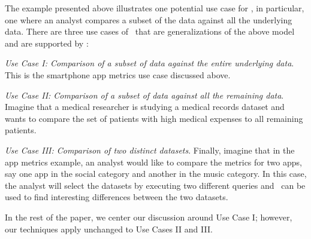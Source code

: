 The example presented above illustrates one potential use case for \SeeDB,
in particular, one where an analyst compares a subset of the data against all
the underlying data.
There are three use cases of \SeeDB\ that are generalizations of the above
model and are supported by \SeeDB:
\begin{denselist}
  \item {\it Use Case I: Comparison of a subset of data against the entire
  underlying data}.
  This is the smartphone app metrics use case discussed above.
  \item {\it Use Case II: Comparison of a subset of data against all the
  remaining data}.
  Imagine that a medical researcher is studying a medical records dataset and
  wants to compare the set of patients with high medical expenses to all
  remaining patients. 
  \item {\it Use Case III: Comparison of two distinct datasets}. Finally,
  imagine that in the app metrics example, an analyst would like to compare
  the metrics for two apps, say one app in the social category and another in
  the music category. In this case, the analyst will select the datasets
  by executing two different queries and \SeeDB\ can be used to find
  interesting differences between the two datasets.
\end{denselist}
In the rest of the paper, we center our discussion around Use Case I; however,
our techniques apply unchanged to Use Cases II and III.

